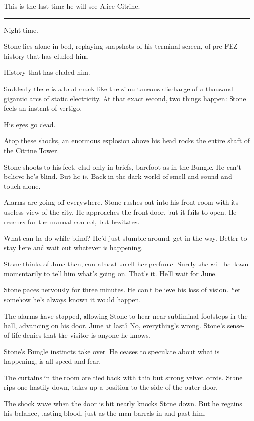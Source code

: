 This is the last time he will see Alice Citrine.

\fancybreak{* * *}

Night time.

Stone lies alone in bed, replaying snapshots of his terminal screen, of pre-FEZ history that has eluded him.

History that has eluded him.

Suddenly there is a loud crack like the simultaneous discharge of a thousand gigantic arcs of static electricity. At that exact second, two things happen: Stone feels an instant of vertigo.

His eyes go dead.

Atop these shocks, an enormous explosion above his head rocks the entire shaft of the Citrine Tower.

Stone shoots to his feet, clad only in briefs, barefoot as in the Bungle. He can't believe he's blind. But he is. Back in the dark world of smell and sound and touch alone.

Alarms are going off everywhere. Stone rushes out into his front room with its useless view of the city. He approaches the front door, but it fails to open. He reaches for the manual control, but hesitates.

What can he do while blind? He'd just stumble around, get in the way. Better to stay here and wait out whatever is happening.

Stone thinks of.June then, can almost smell her perfume. Surely she will be down momentarily to tell him what's going on. That's it. He'll wait for June.

Stone paces nervously for three minutes. He can't believe his loss of vision. Yet somehow he's always known it would happen.

The alarms have stopped, allowing Stone to hear near-subliminal footsteps in the hall, advancing on his door. June at last? No, everything's wrong. Stone's sense-of-life denies that the visitor is anyone he knows.

Stone's Bungle instincts take over. He ceases to speculate about what is happening, is all speed and fear.

The curtains in the room are tied back with thin but strong velvet cords. Stone rips one hastily down, takes up a position to the side of the outer door.

The shock wave when the door is hit nearly knocks Stone down. But he regains his balance, tasting blood, just as the man barrels in and past him.

